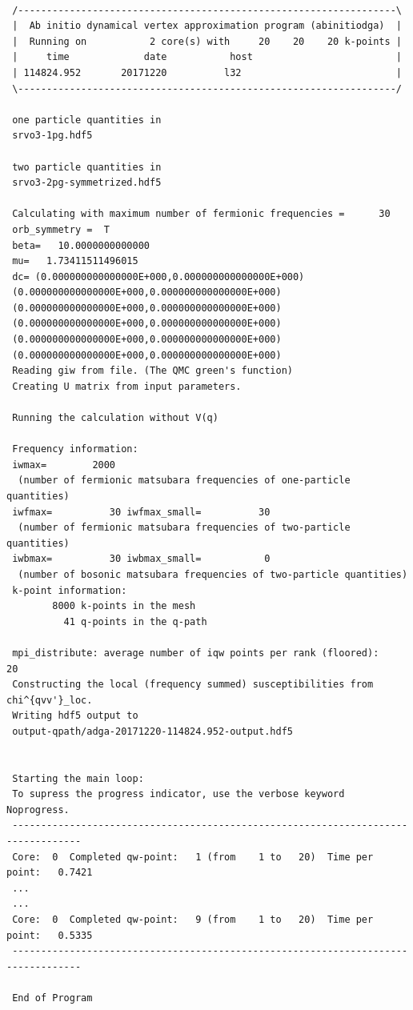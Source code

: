 \documentclass[a4paper,11pt]{article}
\numberwithin{equation}{section} %
\begin{document}
\begin{lstlisting}[caption=ADGA log file, frame=single, basicstyle=\footnotesize, label={lst:out}]

 /------------------------------------------------------------------\
 |  Ab initio dynamical vertex approximation program (abinitiodga)  |
 |  Running on           2 core(s) with     20    20    20 k-points |
 |     time             date           host                         |
 | 114824.952       20171220          l32                           |
 \------------------------------------------------------------------/

 one particle quantities in
 srvo3-1pg.hdf5

 two particle quantities in
 srvo3-2pg-symmetrized.hdf5

 Calculating with maximum number of fermionic frequencies =      30
 orb_symmetry =  T
 beta=   10.0000000000000
 mu=   1.73411511496015
 dc= (0.000000000000000E+000,0.000000000000000E+000)
 (0.000000000000000E+000,0.000000000000000E+000)
 (0.000000000000000E+000,0.000000000000000E+000)
 (0.000000000000000E+000,0.000000000000000E+000)
 (0.000000000000000E+000,0.000000000000000E+000)
 (0.000000000000000E+000,0.000000000000000E+000)
 Reading giw from file. (The QMC green's function)
 Creating U matrix from input parameters.

 Running the calculation without V(q)

 Frequency information:
 iwmax=        2000
  (number of fermionic matsubara frequencies of one-particle quantities)
 iwfmax=          30 iwfmax_small=          30
  (number of fermionic matsubara frequencies of two-particle quantities)
 iwbmax=          30 iwbmax_small=           0
  (number of bosonic matsubara frequencies of two-particle quantities)
 k-point information:
        8000 k-points in the mesh
          41 q-points in the q-path

 mpi_distribute: average number of iqw points per rank (floored):       20
 Constructing the local (frequency summed) susceptibilities from chi^{qvv'}_loc.
 Writing hdf5 output to
 output-qpath/adga-20171220-114824.952-output.hdf5


 Starting the main loop:
 To supress the progress indicator, use the verbose keyword Noprogress.
 ----------------------------------------------------------------------------------
 Core:  0  Completed qw-point:   1 (from    1 to   20)  Time per point:   0.7421
 ...
 ...
 Core:  0  Completed qw-point:   9 (from    1 to   20)  Time per point:   0.5335
 ----------------------------------------------------------------------------------

 End of Program
\end{lstlisting}
\end{document}
